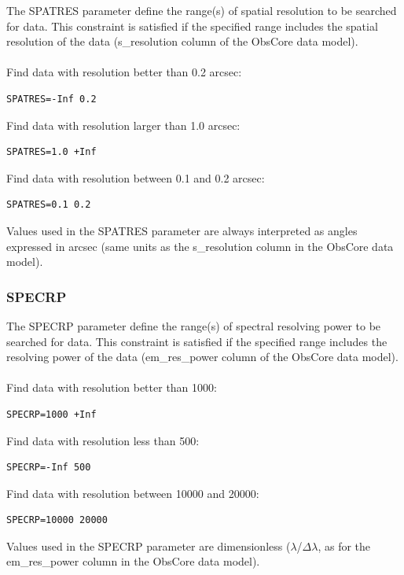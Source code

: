\documentclass[11pt,a4paper]{ivoa}
\begin{document}
The SPATRES parameter define the range(s) of spatial resolution to be searched for data. This constraint is satisfied if the specified range includes the spatial resolution of the data (s\_resolution column of the ObsCore data model). \\ \\
Find data with resolution better than 0.2 arcsec:

\begin{lstlisting}
SPATRES=-Inf 0.2
\end{lstlisting}
Find data with resolution larger than 1.0 arcsec:

\begin{lstlisting}
SPATRES=1.0 +Inf 
\end{lstlisting}
Find data with resolution between 0.1 and 0.2 arcsec:

\begin{lstlisting}
SPATRES=0.1 0.2
\end{lstlisting}

Values used in the SPATRES parameter are always interpreted as angles expressed in arcsec (same units as the s\_resolution column in the ObsCore data model).

\subsubsection{SPECRP}

The SPECRP parameter define the range(s) of spectral resolving power to be searched for data. This constraint is satisfied if the specified range includes the resolving power of the data (em\_res\_power column of the ObsCore data model). \\ \\
Find data with resolution better than 1000:

\begin{lstlisting}
SPECRP=1000 +Inf
\end{lstlisting}
Find data with resolution less than 500:

\begin{lstlisting}
SPECRP=-Inf 500
\end{lstlisting}
Find data with resolution between 10000 and 20000:

\begin{lstlisting}
SPECRP=10000 20000
\end{lstlisting}


Values used in the SPECRP parameter are dimensionless ($\lambda$/$\Delta$$\lambda$, as for the em\_res\_power column in the ObsCore data model).
\end{document}
